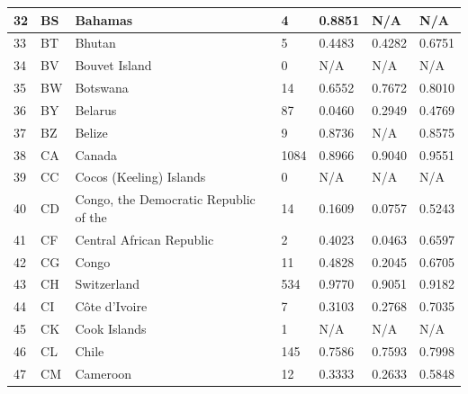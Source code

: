\documentclass{article}
\begin{document}
\begin{table}
\begin{longtable}{|l|l|l|l|l|l|l|}
32  & BS           & Bahamas                                              & 4     & 0.8851 & N/A    & N/A    \\ \hline
33  & BT           & Bhutan                                               & 5     & 0.4483 & 0.4282 & 0.6751 \\ \hline
34  & BV           & Bouvet Island                                        & 0     & N/A    & N/A    & N/A    \\ \hline
35  & BW           & Botswana                                             & 14    & 0.6552 & 0.7672 & 0.8010 \\ \hline
36  & BY           & Belarus                                              & 87    & 0.0460 & 0.2949 & 0.4769 \\ \hline
37  & BZ           & Belize                                               & 9     & 0.8736 & N/A    & 0.8575 \\ \hline
38  & CA           & Canada                                               & 1084  & 0.8966 & 0.9040 & 0.9551 \\ \hline
39  & CC           & Cocos (Keeling) Islands                              & 0     & N/A    & N/A    & N/A    \\ \hline
40  & CD           & Congo, the Democratic Republic of the                & 14    & 0.1609 & 0.0757 & 0.5243 \\ \hline
41  & CF           & Central African Republic                             & 2     & 0.4023 & 0.0463 & 0.6597 \\ \hline
42  & CG           & Congo                                                & 11    & 0.4828 & 0.2045 & 0.6705 \\ \hline
43  & CH           & Switzerland                                          & 534   & 0.9770 & 0.9051 & 0.9182 \\ \hline
44  & CI           & Côte d'Ivoire                                        & 7     & 0.3103 & 0.2768 & 0.7035 \\ \hline
45  & CK           & Cook Islands                                         & 1     & N/A    & N/A    & N/A    \\ \hline
46  & CL           & Chile                                                & 145   & 0.7586 & 0.7593 & 0.7998 \\ \hline
47  & CM           & Cameroon                                             & 12    & 0.3333 & 0.2633 & 0.5848 \\ \hline
\end{longtable}
\end{table}
\end{document}
